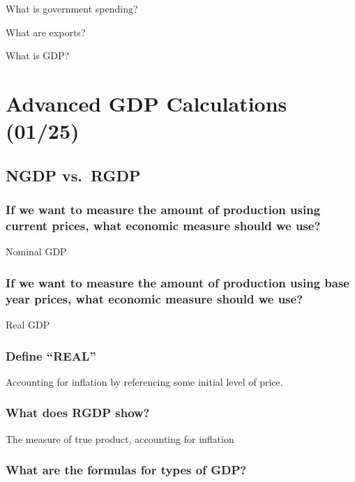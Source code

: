 \documentclass[
  letterpaper,
  DIV=11,
  numbers=noendperiod]{scrartcl}
\begin{document}
What is government spending?

What are exports?

What is GDP?

\newpage{}

\section{Advanced GDP Calculations
(01/25)}\label{advanced-gdp-calculations-0125}

\subsection{NGDP vs.~RGDP}\label{ngdp-vs.-rgdp}

\subsubsection{If we want to measure the amount of production using
current prices, what economic measure should we
use?}\label{if-we-want-to-measure-the-amount-of-production-using-current-prices-what-economic-measure-should-we-use}

Nominal GDP

\subsubsection{If we want to measure the amount of production using base
year prices, what economic measure should we
use?}\label{if-we-want-to-measure-the-amount-of-production-using-base-year-prices-what-economic-measure-should-we-use}

Real GDP

\subsubsection{Define ``REAL''}\label{define-real}

Accounting for inflation by referencing some initial level of price.

\subsubsection{What does RGDP show?}\label{what-does-rgdp-show}

The measure of true product, accounting for inflation

\subsubsection{What are the formulas for types of
GDP?}\label{what-are-the-formulas-for-types-of-gdp}
\end{document}
